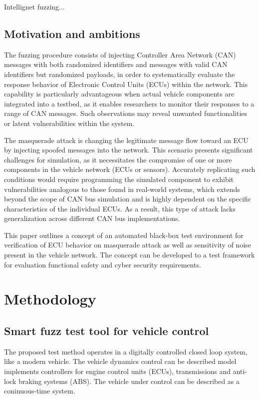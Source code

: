 \documentclass[a4paper, fleqn]{cas-dc}
\begin{document}
	Intellignet fuzzing...
	\cite{zhu2022fuzzing}
	
	\subsection{Motivation and ambitions}
	
	The fuzzing procedure consists of injecting Controller Area Network (CAN) messages with both randomized identifiers and messages with valid CAN identifiers but randomized payloads, in order to systematically evaluate the response behavior of Electronic Control Units (ECUs) within the network. This capability is particularly advantageous when actual vehicle components are integrated into a testbed, as it enables researchers to monitor their responses to a range of CAN messages. Such observations may reveal unwanted functionalities or latent vulnerabilities within the system. 
	
	The masquerade attack is changing the legitimate message flow toward an ECU by injecting spoofed messages into the network. This scenario presents significant challenges for simulation, as it necessitates the compromise of one or more components in the vehicle network (ECUs or sensors). Accurately replicating such conditions would require programming the simulated component to exhibit vulnerabilities analogous to those found in real-world systems, which extends beyond the scope of CAN bus simulation and is highly dependent on the specific characteristics of the individual ECUs. As a result, this type of attack lacks generalization across different CAN bus implementations.
	
	This paper outlines a concept of an automated black-box test environment for verification of ECU behavior on masquerade attack as well as sensitivity of noise present in the vehicle network. The concept can be developed to a test framework for evaluation functional safety and cyber security requirements.
	
	\section{Methodology}
	\subsection{Smart fuzz test tool for vehicle control}
	
	The proposed test method operates in a digitally controlled closed loop system, like a modern vehicle. The vehicle dynamics control can be described model implements controllers for engine control units (ECUs), transmissions and anti-lock braking systems (ABS). The vehicle under control can be described as a coninuous-time system.
	
\end{document}
